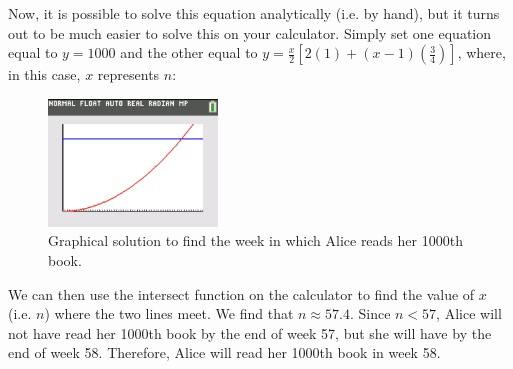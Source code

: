 \begin{answer}
\begin{enumerate}[label=(\alph*)]
		Now, it is possible to solve this equation analytically (i.e. by hand), but it turns out to be much
		easier to solve this on your calculator. Simply set one equation equal to $y=1000$ and the other equal to $y=\frac{x}{2}[2(1) + (x-1)(\frac{3}{4})]$, where, in this case,
		$x$ represents $n$:
		\begin{figure}[H]
			\centering
			\includegraphics[width=0.4\textwidth]{Figures/gdc-1.png}
			\caption{Graphical solution to find the week in which Alice reads her 1000th book.}
			\label{fig:gdc-1}
		\end{figure}
	\end{enumerate}
	We can then use the intersect function on the calculator to find the value of $x$ (i.e. $n$)
	where the two lines meet. We find that $n \approx 57.4$. Since $n<57$, Alice will not have read her 1000th book
	by the end of week 57, but she will have by the end of week 58. Therefore, Alice will read her 1000th book in week 58.
\end{answer}

